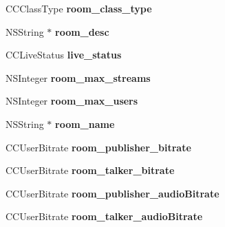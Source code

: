 \begin{DoxyCompactItemize}
\item 
\mbox{\label{interface_c_c_room_a1814318aaa2bcb35ef924c27468d830e}} 
C\+C\+Class\+Type {\bfseries room\+\_\+class\+\_\+type}
\item 
\mbox{\label{interface_c_c_room_a14de7a468f6ac2945857ca3e5811b45c}} 
N\+S\+String $\ast$ {\bfseries room\+\_\+desc}
\item 
\mbox{\label{interface_c_c_room_a16da7fb319176006d508823e48c27d28}} 
C\+C\+Live\+Status {\bfseries live\+\_\+status}
\item 
\mbox{\label{interface_c_c_room_a207df907778fed05d8a67b399195e723}} 
N\+S\+Integer {\bfseries room\+\_\+max\+\_\+streams}
\item 
\mbox{\label{interface_c_c_room_a1a2098e49652964449e09e92255a2a1e}} 
N\+S\+Integer {\bfseries room\+\_\+max\+\_\+users}
\item 
\mbox{\label{interface_c_c_room_a8b0349bb26c99133096b3c82a12dee45}} 
N\+S\+String $\ast$ {\bfseries room\+\_\+name}
\item 
\mbox{\label{interface_c_c_room_aa277174e9ba194705b8182f7711ba8c1}} 
C\+C\+User\+Bitrate {\bfseries room\+\_\+publisher\+\_\+bitrate}
\item 
\mbox{\label{interface_c_c_room_abcf367042035425ef6b9e76e53c34065}} 
C\+C\+User\+Bitrate {\bfseries room\+\_\+talker\+\_\+bitrate}
\item 
\mbox{\label{interface_c_c_room_a09e228b43d901434c19150c82514b78f}} 
C\+C\+User\+Bitrate {\bfseries room\+\_\+publisher\+\_\+audio\+Bitrate}
\item 
\mbox{\label{interface_c_c_room_a4688633cdc23b21991872dc2e0818089}} 
C\+C\+User\+Bitrate {\bfseries room\+\_\+talker\+\_\+audio\+Bitrate}
\item 
\mbox{\label{interface_c_c_room_af8985c5e58334e9d1221c98bb5c4c718}} 

\end{DoxyCompactItemize}
